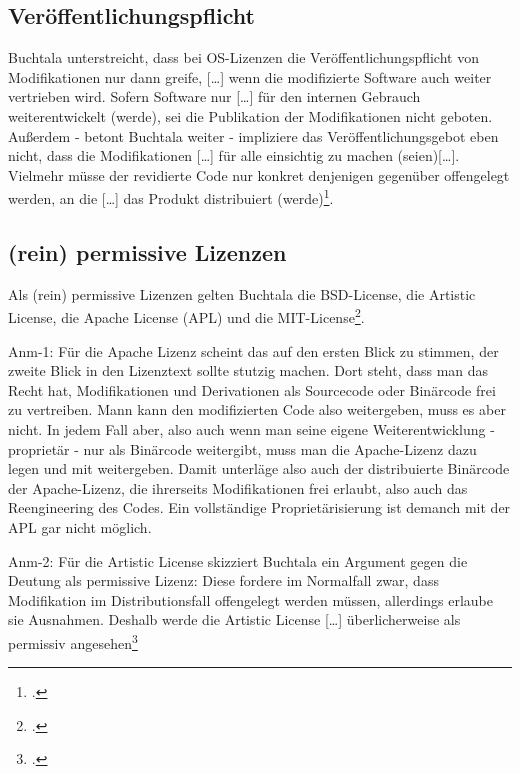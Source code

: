 \documentclass[DIV=calc,BCOR=5mm,11pt,headings=small,oneside,abstract=true, toc=bib]{scrartcl}
\begin{document}
\subsection{Veröffentlichungspflicht}
Buchtala unterstreicht, dass bei OS-Lizenzen die Veröffentlichungspflicht von
Modifikationen nur dann greife, \glqq{}[\ldots] wenn die modifizierte Software
auch weiter vertrieben wird\grqq{}. Sofern Software nur \glqq{}[\ldots] für den
internen Gebrauch weiterentwickelt (werde)\grqq{}, sei die Publikation der
Modifikationen nicht geboten. Außerdem - betont Buchtala weiter - impliziere das
Veröffentlichungsgebot eben nicht, dass die Modifikationen \glqq{}[\ldots] für
alle einsichtig zu machen (seien)[\ldots]\grqq{}. Vielmehr müsse der revidierte
Code nur konkret denjenigen gegenüber offengelegt werden, an die \glqq{}[\ldots]
das Produkt distribuiert (werde)\grqq{}\footcite[cf.][168 - B. beruft sich
selbst auf Henkel 2003 u. 2004b]{Buchtala2007a}.

\subsection{(rein) permissive Lizenzen}
Als (rein) permissive Lizenzen gelten Buchtala die BSD-License, die Artistic
License, die Apache License (APL) und die
MIT-License\footcite[cf.][62]{Buchtala2007a}.

Anm-1: Für die Apache Lizenz scheint das auf den ersten Blick zu stimmen, der
zweite Blick in den Lizenztext sollte stutzig machen. Dort steht, dass man das
Recht hat, Modifikationen und Derivationen als Sourcecode oder Binärcode frei zu
vertreiben. Mann kann den modifizierten Code also weitergeben, muss es aber
nicht. In jedem Fall aber, also auch wenn man seine eigene Weiterentwicklung -
proprietär - nur als Binärcode weitergibt, muss man die Apache-Lizenz dazu legen
und mit weitergeben. Damit unterläge also auch der distribuierte Binärcode der
Apache-Lizenz, die ihrerseits Modifikationen frei erlaubt, also auch das
Reengineering des Codes. Ein vollständige Proprietärisierung ist demanch mit der
APL gar nicht möglich.

Anm-2: Für die Artistic License skizziert Buchtala ein Argument gegen die
Deutung als permissive Lizenz: Diese fordere im Normalfall zwar, dass
Modifikation im Distributionsfall offengelegt werden müssen, allerdings erlaube
sie Ausnahmen. Deshalb werde die Artistic License \glqq{}[\ldots]
überlicherweise als permissiv angesehen\grqq{}\footcite[cf.][61 B. beruft
sich auf Perens, 1999 und Lerner und Tirole 2005, jeweils ohne nähere
Seitenangabe]{Buchtala2007a}
\end{document}
